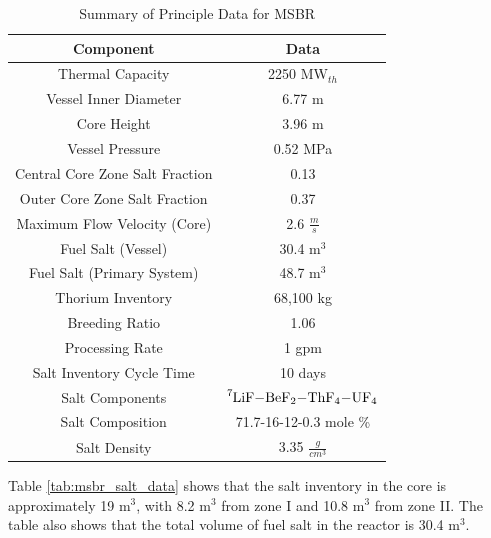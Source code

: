 \begin{table}[H]
\renewcommand{\arraystretch}{1.25}
\caption{Summary of Principle Data for MSBR \cite{robertson_conceptual_1971}}
\label{tab:msbr_gen_data}
\begin{center}
\begin{tabular}{ c | c }
 \hline
 Component & Data\\
 \hline
 \hline
 Thermal Capacity & 2250 MW$_{th}$\\
 Vessel Inner Diameter & 6.77 m\\
 Core Height & 3.96 m\\
 Vessel Pressure & 0.52 MPa\\
 Central Core Zone Salt Fraction & 0.13\\
 Outer Core Zone Salt Fraction & 0.37\\
 Maximum Flow Velocity (Core) & 2.6 $\frac{m}{s}$\\
 Fuel Salt (Vessel) & 30.4 m$^3$\\
 Fuel Salt (Primary System) & 48.7 m$^3$\\
 Thorium Inventory & 68,100 kg\\
 Breeding Ratio & 1.06\\
 Processing Rate & 1 gpm\\
 Salt Inventory Cycle Time & 10 days\\
 Salt Components & $\ce{^{7}LiF-BeF_{2}-ThF_{4}-UF_{4}} $\\
 Salt Composition & 71.7-16-12-0.3 mole \% \\
 Salt Density & 3.35 $\frac{g}{cm^3}$\\
 \hline
\end{tabular}
\end{center}
\end{table}

Table \ref{tab:msbr_salt_data} shows that the salt inventory in the core is approximately 19 m$^3$, with 8.2 m$^3$ from zone I and 10.8 m$^3$ from zone II. The table also shows that the total volume of fuel salt in the reactor is 30.4 m$^3$.


